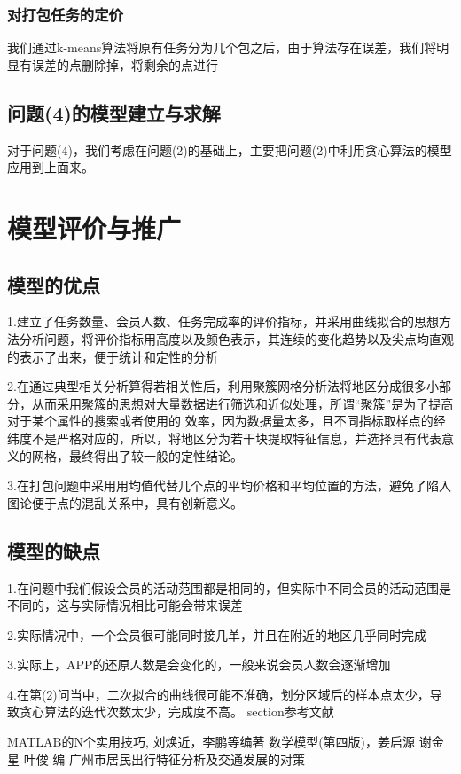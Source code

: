 \documentclass{ctexart}
\begin{document}
\subsubsection{对打包任务的定价}
我们通过k-means算法将原有任务分为几个包之后，由于算法存在误差，我们将明显有误差的点删除掉，将剩余的点进行
\subsection{问题(4)的模型建立与求解}
对于问题(4)，我们考虑在问题(2)的基础上，主要把问题(2)中利用贪心算法的模型应用到上面来。


\section{模型评价与推广}
\subsection{模型的优点}
1.建立了任务数量、会员人数、任务完成率的评价指标，并采用曲线拟合的思想方法分析问题，将评价指标用高度以及颜色表示，其连续的变化趋势以及尖点均直观的表示了出来，便于统计和定性的分析

2.在通过典型相关分析算得若相关性后，利用聚簇网格分析法将地区分成很多小部分，从而采用聚簇的思想对大量数据进行筛选和近似处理，所谓“聚簇”是为了提高对于某个属性的搜索或者使用的 效率，因为数据量太多，且不同指标取样点的经纬度不是严格对应的，所以，将地区分为若干块提取特征信息，并选择具有代表意义的网格，最终得出了较一般的定性结论。

3.在打包问题中采用用均值代替几个点的平均价格和平均位置的方法，避免了陷入图论便于点的混乱关系中，具有创新意义。


\subsection{模型的缺点}
1.在问题中我们假设会员的活动范围都是相同的，但实际中不同会员的活动范围是不同的，这与实际情况相比可能会带来误差

2.实际情况中，一个会员很可能同时接几单，并且在附近的地区几乎同时完成

3.实际上，APP的还原人数是会变化的，一般来说会员人数会逐渐增加

4.在第(2)问当中，二次拟合的曲线很可能不准确，划分区域后的样本点太少，导致贪心算法的迭代次数太少，完成度不高。
section{参考文献}
\begin{thebibliography}{9}
 MATLAB的N个实用技巧, 刘焕近，李鹏等编著
 数学模型(第四版)，姜启源 谢金星 叶俊 编
 广州市居民出行特征分析及交通发展的对策
\end{thebibliography}
\end{document}
